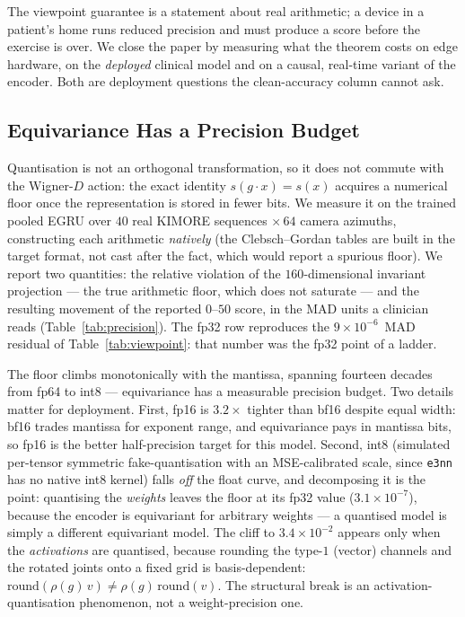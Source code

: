 \documentclass[10pt,journal]{IEEEtran}
\begin{document}
The viewpoint guarantee is a statement about real arithmetic; a device in a patient's home runs
reduced precision and must produce a score before the exercise is over. We close the paper by
measuring what the theorem costs on edge hardware, on the \emph{deployed} clinical model and on a
causal, real-time variant of the encoder. Both are deployment questions the clean-accuracy column
cannot ask.

\subsection{Equivariance Has a Precision Budget}
\label{sec:deploy:precision}

Quantisation is not an orthogonal transformation, so it does not commute with the Wigner-$D$ action:
the exact identity $s(g\cdot x)=s(x)$ acquires a numerical floor once the representation is stored in
fewer bits. We measure it on the trained pooled EGRU over $40$ real KIMORE sequences $\times\,64$
camera azimuths, constructing each arithmetic \emph{natively} (the Clebsch--Gordan tables are built
in the target format, not cast after the fact, which would report a spurious floor). We report two
quantities: the relative violation of the $160$-dimensional invariant projection --- the true
arithmetic floor, which does not saturate --- and the resulting movement of the reported $0$--$50$
score, in the MAD units a clinician reads (Table~\ref{tab:precision}). The fp32 row reproduces the
$9\times10^{-6}$~MAD residual of Table~\ref{tab:viewpoint}: that number was the fp32 point of a ladder.

The floor climbs monotonically with the mantissa, spanning fourteen decades from fp64 to int8 ---
equivariance has a measurable precision budget. Two details matter for deployment. First, fp16 is
$3.2\times$ tighter than bf16 despite equal width: bf16 trades mantissa for exponent range, and
equivariance pays in mantissa bits, so fp16 is the better half-precision target for this model.
Second, int8 (simulated per-tensor symmetric fake-quantisation with an MSE-calibrated scale, since
\texttt{e3nn} has no native int8 kernel) falls \emph{off} the float curve, and decomposing it is the
point: quantising the \emph{weights} leaves the floor at its fp32 value ($3.1\times10^{-7}$), because
the encoder is equivariant for arbitrary weights --- a quantised model is simply a different
equivariant model. The cliff to $3.4\times10^{-2}$ appears only when the \emph{activations} are
quantised, because rounding the type-$1$ (vector) channels and the rotated joints onto a fixed grid
is basis-dependent: $\mathrm{round}(\rho(g)\,v)\neq\rho(g)\,\mathrm{round}(v)$. The structural break
is an activation-quantisation phenomenon, not a weight-precision one.
\end{document}
